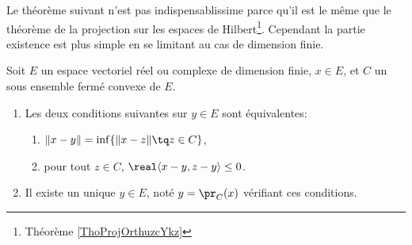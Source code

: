 Le théorème suivant n'est pas indispensablissime parce qu'il est le même que le théorème de la projection sur les espaces de Hilbert\footnote{Théorème \ref{ThoProjOrthuzcYkz}}. Cependant la partie existence est plus simple en se limitant au cas de dimension finie.
\begin{theorem}  \label{ThoWKwosrH}
    Soit \( E\) un espace vectoriel réel ou complexe de dimension finie, \( x\in E\), et \( C\) un sous ensemble fermé convexe de \(E\).
    \begin{enumerate}
        \item
            Les deux conditions suivantes sur \( y\in E\) sont équivalentes:
    \begin{enumerate}
        \item   \label{zzETsfYCSItemi}
            \( \| x-y \|=\inf\{ \| x-z \|\tq z\in C \}\),
        \item\label{zzETsfYCSItemii}
            pour tout \( z\in C\), \( \real\langle x-y, z-y\rangle \leq 0\).
    \end{enumerate}
\item
    Il existe un unique \( y\in E\), noté \( y=\pr_C(x)\) vérifiant ces conditions.
    \end{enumerate}
\end{theorem}

